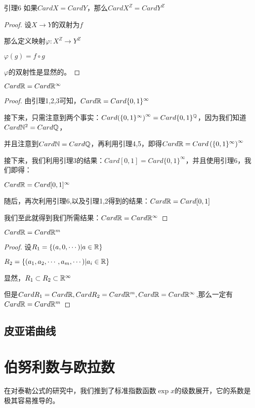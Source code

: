 \documentclass[12pt, a4paper, oneside, UTF8]{ctexbook}
\begin{document}
			\begin{lemma}{引理6}
				如果$Card X = Card Y$，那么$Card X^Z = Card Y^Z$
			\end{lemma}
			\begin{proof}
				设$X\rightarrow Y$的双射为$f$
				
				那么定义映射$\varphi:X^Z \rightarrow Y^Z$
				
				$\varphi(g) = f \circ g$
				
				$\varphi$的双射性是显然的。
			\end{proof}
			\begin{proposition}
				$Card \mathbb{R} = Card \mathbb{R}^\infty$
			\end{proposition}
			\begin{proof}
				由引理1,2,3可知，$Card \mathbb{R} = Card \{0,1\}^\infty$
				
				接下来，只需注意到两个事实：$Card {\left(\{0,1\}^{\infty}\right)^{\infty} }= Card \{0,1\}^{\mathbb{Q}}$，因为我们知道$Card {\mathbb{N}^2} = Card {\mathbb{Q}}$，
				
				并且注意到$Card \mathbb{N} = Card \mathbb{Q}$，再利用引理4,5，即得$Card \mathbb{R} = Card \left(\{0,1\}^\infty\right)^\infty$
				
				接下来，我们利用引理3的结果：$Card [0,1] = Card \{0,1\}^\infty$，并且使用引理6，我们即得：
				
				$Card \mathbb{R} = Card [0,1]^\infty$
				
				随后，再次利用引理6,以及引理1,2得到的结果：$Card \mathbb{R} = Card [0,1]$
				
				我们至此就得到我们所需结果：$Card \mathbb{R} = Card \mathbb{R}^\infty$
			\end{proof}
			\begin{proposition}
				$Card \mathbb{R} = Card \mathbb{R}^m$
			\end{proposition}
			\begin{proof}
				设$R_1 = \{(a,0,\cdots)|a \in \mathbb{R}\}$
				
				$R_2 = \{(a_1,a_2,\cdots,a_m,\cdots)|a_i \in \mathbb{R}\}$
				
				显然，$R_1 \subset R_2 \subset \mathbb{R}^\infty$
				
				但是$Card R_1 = Card \mathbb{R},Card R_2 = Card \mathbb{R}^m,Card \mathbb{R} = Card \mathbb{R}^\infty$,那么一定有$Card \mathbb{R} = Card \mathbb{R}^m$
			\end{proof}
		\subsection{皮亚诺曲线}
	\section{伯努利数与欧拉数}
		在对泰勒公式的研究中，我们推到了标准指数函数$\exp x$的级数展开，它的系数是极其容易推导的。
		
\end{document}
